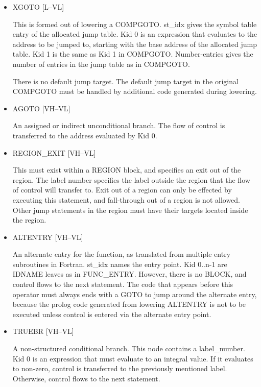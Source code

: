 \begin{itemize}
\item
{}%
XGOTO [L--VL]

This is formed out of lowering a
%
COMPGOTO. st\_idx gives the symbol
table entry of the allocated jump table. Kid 0 is an expression
that evaluates
to the address to be jumped to, starting with the base address of
the allocated jump table. Kid 1 is the same as Kid 1 in
%
COMPGOTO. Number-entries gives the number of entries in the jump
table as in
%
COMPGOTO.


There is no default jump target. The default jump target in the
original
%
COMPGOTO must be handled by additional code generated
during lowering.

\item
{}%
AGOTO \hfill [VH--VL]

An assigned or indirect unconditional branch. The flow of control
is transferred to the address evaluated by Kid 0.

\item
{}%
REGION\_EXIT \hfill [VH--VL]

This must exist within a
%
REGION block, and specifies an exit out
of the region. The label number specifies the label outside the
region that the
flow of control will transfer to. Exit out of a region can only be
effected by executing this statement, and fall-through out of a
region is not allowed. Other jump statements in the region must
have their targets located inside the region.

\item
{}%
ALTENTRY \hfill [VH--VL]

An alternate entry for the function, as translated from multiple
entry subroutines in Fortran. st\_idx names the entry point. Kid
0..n-1 are
%
IDNAME leaves as in 
%
FUNC\_ENTRY. However, there is no
%
BLOCK, and
control flows to the next statement. The code that appears before
this operator
must always ends with a
%
GOTO to jump around the alternate entry,
because the prolog code generated from lowering
%
ALTENTRY is not to be executed unless control is entered via the
alternate entry point.

\item
{}%
TRUEBR \hfill [VH--VL]

A non-structured conditional branch. This node contains a
label\_number. Kid 0 is an expression that must evaluate to an integral
value. If it evaluates to non-zero, control is transferred to the
previously mentioned label. Otherwise, control flows to the next
statement.


\end{itemize}
